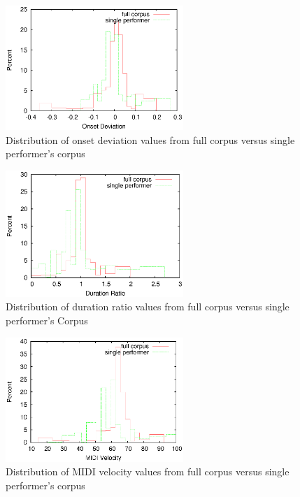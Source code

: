 \begin{figure}[tp]
   \begin{center}
      \includegraphics[width=0.6\textwidth]{fig/all_01_onset}
   \end{center}
   \caption{Distribution of onset deviation values from full corpus versus single performer's corpus}
   \label{fig:distonset}
\end{figure}
\begin{figure}[tp]
   \begin{center}
      \includegraphics[width=0.6\textwidth]{fig/all_01_duration}
   \end{center}
   \caption{Distribution of duration ratio values from full corpus versus single performer's Corpus}
   \label{fig:distdur}
\end{figure}
\begin{figure}[tp]
   \begin{center}
      \includegraphics[width=0.6\textwidth]{fig/all_01_velocity}
   \end{center}
   \caption{Distribution of MIDI velocity values from full corpus versus single performer's corpus}
   \label{fig:distvel}
\end{figure}


